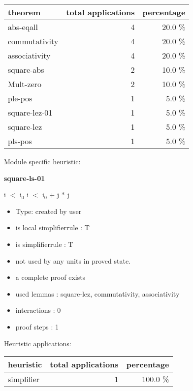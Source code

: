 \documentclass[a4paper]{article}
\begin{document}
\begin{supertabular}{l|r|r}
theorem	        & total applications & percentage \\ \hline
abs-eqall & 4 & 20.0 \% \\
commutativity & 4 & 20.0 \% \\
associativity & 4 & 20.0 \% \\
square-abs & 2 & 10.0 \% \\
Mult-zero & 2 & 10.0 \% \\
ple-pos & 1 & 5.0 \% \\
square-lez-01 & 1 & 5.0 \% \\
square-lez & 1 & 5.0 \% \\
pls-pos & 1 & 5.0 \% \\

\end{supertabular}

Module specific heuristic:

\pagebreak

{\LARGE\bf square-ls-01}\label{lemma-square-ls-01}

\medskip

 \Fol i $<$ $\mbox{i}_{0}$ \Imp i $<$ $\mbox{i}_{0}$ + j $*$ j

\begin{itemize}

\item Type: created by user

\item is local simplifierrule : T
\item is simplifierrule : T
\item not used by any units in proved state.
\item       a complete proof exists
\item       used lemmas  : square-lez, commutativity, associativity
\item       interactions : 0
\item       proof steps  : 1
\end{itemize}

\medskip


Heuristic applications:

\begin{supertabular}{l|r|r}
heuristic	& total applications & percentage \\ \hline
simplifier & 1 & 100.0 \% \\

\end{supertabular}
\end{document}
